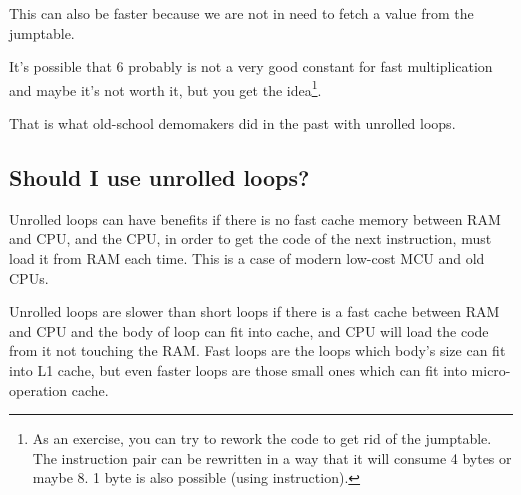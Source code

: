 This can also be faster because we are not in need to fetch a value from the jumptable.

It's possible that 6 probably is not a very good constant for fast multiplication and maybe it's not worth it,
but you get the idea\footnote{As an exercise, you can try to rework the code to get rid of 
the jumptable. 
The instruction pair can be rewritten in a way that it will consume 4 bytes or maybe 8. 
1 byte is also possible (using  instruction).}.

That is what old-school demomakers did in the past with unrolled loops.

\subsection{Should I use unrolled loops?}

Unrolled loops can have benefits if there is no fast cache memory between \ac{RAM} and \ac{CPU}, and the \ac{CPU},
in order to get the code of the next instruction, must load it from \ac{RAM} each time.
This is a case of modern low-cost \ac{MCU} and old \ac{CPU}s.

Unrolled loops are slower than short loops if there is a fast cache between \ac{RAM} and \ac{CPU} and the body of loop
can fit into cache, and \ac{CPU} will load the code from it not touching the \ac{RAM}.
Fast loops are the loops which body's size can fit into L1 cache, but even faster loops are those small ones
which can fit into micro-operation cache.

